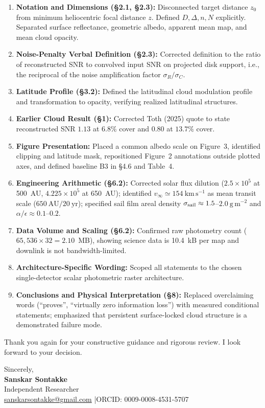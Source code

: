 \documentclass[11pt]{article}
\begin{document}
\begin{enumerate}
    \item \textbf{Notation and Dimensions (§2.1, §2.3):} Disconnected target distance $z_0$ from minimum heliocentric focal distance $z$. Defined $D, \Delta, n, N$ explicitly. Separated surface reflectance, geometric albedo, apparent mean map, and mean cloud opacity.
    \item \textbf{Noise-Penalty Verbal Definition (§2.3):} Corrected definition to the ratio of reconstructed SNR to convolved input SNR on projected disk support, i.e., the reciprocal of the noise amplification factor $\sigma_R/\sigma_C$.
    \item \textbf{Latitude Profile (§3.2):} Defined the latitudinal cloud modulation profile and transformation to opacity, verifying realized latitudinal structures.
    \item \textbf{Earlier Cloud Result (§1):} Corrected Toth (2025) quote to state reconstructed SNR $1.13$ at $6.8\%$ cover and $0.80$ at $13.7\%$ cover.
    \item \textbf{Figure Presentation:} Placed a common albedo scale on Figure~3, identified clipping and latitude mask, repositioned Figure~2 annotations outside plotted axes, and defined baseline B3 in §4.6 and Table~4.
    \item \textbf{Engineering Arithmetic (§6.2):} Corrected solar flux dilution ($2.5\times 10^5$ at 500~AU, $4.225\times 10^5$ at 650~AU); identified $v_\infty \simeq 154\ \mathrm{km\,s^{-1}}$ as mean transit scale ($650\ \mathrm{AU}/20\ \mathrm{yr}$); specified sail film areal density $\sigma_{\rm sail} \approx 1.5$--$2.0\ \mathrm{g\,m^{-2}}$ and $\alpha/\epsilon \approx 0.1$--$0.2$.
    \item \textbf{Data Volume and Scaling (§6.2):} Confirmed raw photometry count ($65,536 \times 32 = 2.10$~MB), showing science data is 10.4~kB per map and downlink is not bandwidth-limited.
    \item \textbf{Architecture-Specific Wording:} Scoped all statements to the chosen single-detector scalar photometric raster architecture.
    \item \textbf{Conclusions and Physical Interpretation (§8):} Replaced overclaiming words (``proves'', ``virtually zero information loss'') with measured conditional statements; emphasized that persistent surface-locked cloud structure is a demonstrated failure mode.
\end{enumerate}

\vspace{4mm}
Thank you again for your constructive guidance and rigorous review. I look forward to your decision.

\vspace{6mm}
Sincerely,\\[2mm]
\textbf{Sanskar Sontakke}\\
Independent Researcher\\
\href{mailto:sanskarsontakke@gmail.com}{sanskarsontakke@gmail.com} \quad|\quad ORCID: 0009-0008-4531-5707
\end{document}

